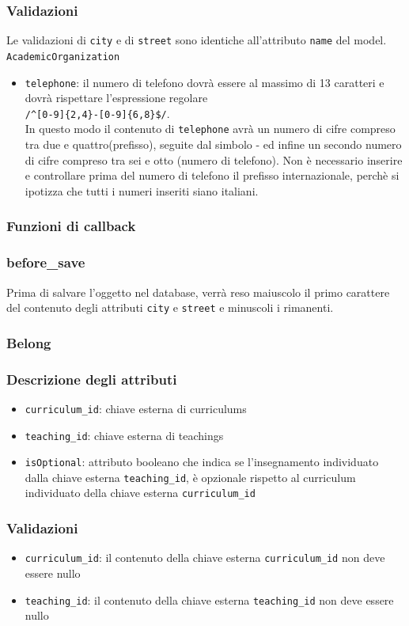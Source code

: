 \documentclass[11pt,a4paper]{article}
\begin{document}
\subsubsection*{Validazioni}
Le validazioni di \verb|city| e di \verb|street| sono identiche all'attributo \verb|name| del model. \verb|AcademicOrganization|
\begin{itemize}
 \item \verb|telephone|: il numero di telefono dovrà essere al massimo di 13 caratteri e dovrà rispettare l'espressione regolare\\
 \verb|/^[0-9]{2,4}-[0-9]{6,8}$/|.\\
In questo modo il contenuto di \verb|telephone| avrà un numero di cifre compreso tra due e quattro(prefisso), seguite dal simbolo - ed infine un secondo numero di cifre compreso tra sei e otto (numero di telefono). Non è necessario inserire e controllare prima del numero di telefono il prefisso internazionale, perchè si ipotizza che tutti i numeri inseriti siano italiani.
\end{itemize}
\subsubsection*{Funzioni di callback}
\subsubsection*{before\_save}
Prima di salvare l'oggetto nel database, verrà reso maiuscolo il primo carattere del contenuto degli attributi \verb|city| e \verb|street| e minuscoli i rimanenti.
\subsubsection{Belong}
\subsubsection*{Descrizione degli attributi}
\begin{itemize}
 \item \verb|curriculum_id|: chiave esterna di curriculums
 \item \verb|teaching_id|: chiave esterna di teachings
 \item \verb|isOptional|: attributo booleano che indica se l'insegnamento individuato dalla chiave esterna \verb|teaching_id|, è opzionale rispetto al curriculum individuato della chiave esterna \verb|curriculum_id|
\end{itemize}
\subsubsection*{Validazioni}
\begin{itemize}
 \item \verb|curriculum_id|: il contenuto della chiave esterna \verb|curriculum_id| non deve essere nullo
 \item \verb|teaching_id|: il contenuto della chiave esterna \verb|teaching_id| non deve essere nullo
\end{itemize}
\end{document}
